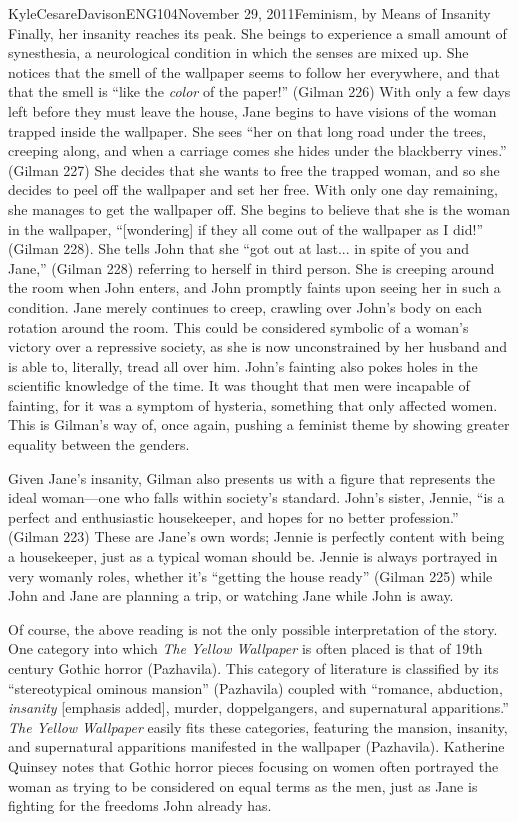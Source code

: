 \documentclass[11pt,letterpaper]{article}
\begin{document}
\begin{mla}{Kyle}{Cesare}{Davison}{ENG104}{November 29, 2011}{Feminism, by Means
of Insanity}
Finally, her insanity reaches its peak.  She beings to experience a small amount
of synesthesia, a neurological condition in which the senses are mixed up.  She
notices that the smell of the wallpaper seems to follow her everywhere, and that
that the smell is ``like the \emph{color} of the paper!'' (Gilman 226) With only
a few days left before they must leave the house, Jane begins to have visions of
the woman trapped inside the wallpaper.  She sees ``her on that long road under
the trees, creeping along, and when a carriage comes she hides under the
blackberry vines.'' (Gilman 227) She decides that she wants to free the trapped
woman, and so she decides to peel off the wallpaper and set her free.  With only
one day remaining, she manages to get the wallpaper off.  She begins to believe
that she is the woman in the wallpaper, ``[wondering] if they all come out of
the wallpaper as I did!'' (Gilman 228).  She tells John that she ``got out at
last...  in spite of you and Jane,'' (Gilman 228) referring to herself in third
person.  She is creeping around the room when John enters, and John promptly
faints upon seeing her in such a condition.  Jane merely continues to creep,
crawling over John's body on each rotation around the room.  This could be
considered symbolic of a woman's victory over a repressive society, as she is
now unconstrained by her husband and is able to, literally, tread all over him.
John's fainting also pokes holes in the scientific knowledge of the time.  It
was thought that men were incapable of fainting, for it was a symptom of
hysteria, something that only affected women.  This is Gilman's way of, once
again, pushing a feminist theme by showing greater equality between the genders.

Given Jane's insanity, Gilman also presents us with a figure that represents the
ideal woman---one who falls within society's standard.  John's sister, Jennie,
``is a perfect and enthusiastic housekeeper, and hopes for no better
profession.'' (Gilman 223)  These are Jane's own words; Jennie is perfectly
content with being a housekeeper, just as a typical woman should be.  Jennie is
always portrayed in very womanly roles, whether it's ``getting the house ready''
(Gilman 225) while John and Jane are planning a trip, or watching Jane while
John is away.

Of course, the above reading is not the only possible interpretation of the
story.  One category into which \emph{The Yellow Wallpaper} is often placed is
that of 19th century Gothic horror (Pazhavila).  This category of literature is
classified by its ``stereotypical ominous mansion'' (Pazhavila) coupled with
``romance, abduction, \emph{insanity} [emphasis added], murder, doppelgangers,
and supernatural apparitions.''  \emph{The Yellow Wallpaper} easily fits these
categories, featuring the mansion, insanity, and supernatural apparitions
manifested in the wallpaper (Pazhavila).  Katherine Quinsey notes that Gothic
horror pieces focusing on women often portrayed the woman as trying to be
considered on equal terms as the men, just as Jane is fighting for the freedoms
John already has.


\end{mla}
\end{document}
